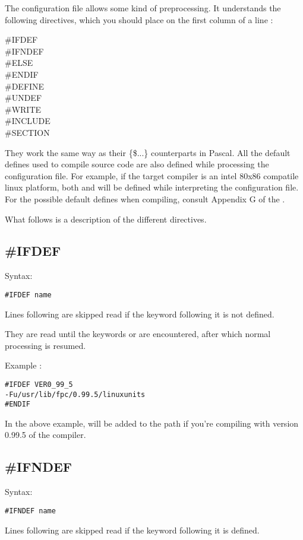 The configuration file allows some kind of preprocessing. It understands the
following directives, which you should place on the first column of a line :
\begin{description}
\item [\#IFDEF]
\item [\#IFNDEF]
\item [\#ELSE]
\item [\#ENDIF]
\item [\#DEFINE]
\item [\#UNDEF]
\item [\#WRITE]
\item [\#INCLUDE]
\item [\#SECTION]
\end{description}
They work the same way as their \{\$...\}  counterparts in Pascal. All the default
defines used to compile source code are also defined while processing the configuration
file. For example, if the target compiler is an intel 80x86 compatile linux platform,
both  and  will be defined while interpreting the configuration
file. For the possible default defines when compiling, consult Appendix G of the \progref.


What follows is a description of the different directives.

\subsection{\#IFDEF}
Syntax:
\begin{verbatim}
#IFDEF name
\end{verbatim}
Lines following  are skipped read if the keyword 
following it is not defined.

They are read until the keywords  or  are
encountered, after which normal processing is resumed.

Example :
\begin{verbatim}
#IFDEF VER0_99_5
-Fu/usr/lib/fpc/0.99.5/linuxunits
#ENDIF
\end{verbatim}
In the above example,  will be added to
the path if you're compiling with version 0.99.5 of the compiler.

\subsection{\#IFNDEF}
Syntax:
\begin{verbatim}
#IFNDEF name
\end{verbatim}
Lines following  are skipped read if the keyword 
following it is defined.

